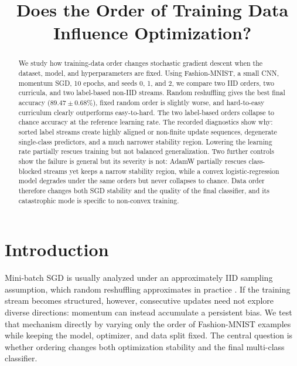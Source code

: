 \documentclass[conference]{IEEEtran}
\begin{document}
\title{Does the Order of Training Data Influence Optimization?}

\author{
}

\maketitle

\begin{abstract}
We study how training-data order changes stochastic gradient descent when
the dataset, model, and hyperparameters are fixed.
Using Fashion-MNIST, a small CNN, momentum SGD, 10 epochs, and seeds 0, 1,
and 2, we compare two IID orders, two curricula, and two label-based
non-IID streams.
Random reshuffling gives the best final accuracy
($89.47\pm0.68\%$), fixed random order is slightly worse, and
hard-to-easy curriculum clearly outperforms easy-to-hard.
The two label-based orders collapse to chance accuracy at the reference
learning rate.
The recorded diagnostics show why: sorted label streams create
highly aligned or non-finite update sequences, degenerate single-class
predictors, and a much narrower stability region.
Lowering the learning rate partially rescues training but not balanced
generalization.
Two further controls show the failure is general but its severity is not:
AdamW partially rescues class-blocked streams yet keeps a narrow stability
region, while a convex logistic-regression model degrades under the same
orders but never collapses to chance.
Data order therefore changes both SGD stability and the quality of the
final classifier, and its catastrophic mode is specific to non-convex
training.
\end{abstract}

\section{Introduction}
Mini-batch SGD is usually analyzed under an approximately IID sampling
assumption, which random reshuffling approximates in practice
\cite{bottou2018,gurbuzbalaban2021}.
If the training stream becomes structured, however, consecutive updates
need not explore diverse directions: momentum can instead accumulate a
persistent bias.
We test that mechanism directly by varying only the order of
Fashion-MNIST examples while keeping the model, optimizer, and data split
fixed.
The central question is whether ordering changes both optimization
stability and the final multi-class classifier.
\end{document}
